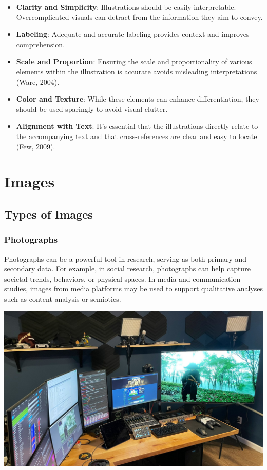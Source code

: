 \documentclass[
  b5paper]{book}
\begin{document}
\begin{itemize}
\item
  \textbf{Clarity and Simplicity}: Illustrations should be easily interpretable. Overcomplicated visuals can detract from the information they aim to convey.
\item
  \textbf{Labeling}: Adequate and accurate labeling provides context and improves comprehension.
\item
  \textbf{Scale and Proportion}: Ensuring the scale and proportionality of various elements within the illustration is accurate avoids misleading interpretations (Ware, 2004).
\item
  \textbf{Color and Texture}: While these elements can enhance differentiation, they should be used sparingly to avoid visual clutter.
\item
  \textbf{Alignment with Text}: It's essential that the illustrations directly relate to the accompanying text and that cross-references are clear and easy to locate (Few, 2009).
\end{itemize}

\hypertarget{images}{%
\section{Images}\label{images}}

\hypertarget{types-of-images}{%
\subsection*{Types of Images}\label{types-of-images}}

\hypertarget{photographs}{%
\subsubsection*{Photographs}\label{photographs}}

Photographs can be a powerful tool in research, serving as both primary and secondary data. For example, in social research, photographs can help capture societal trends, behaviors, or physical spaces. In media and communication studies, images from media platforms may be used to support qualitative analyses such as content analysis or semiotics.

\includegraphics[width=1\textwidth,height=\textheight]{images/itmejp.jpg}
\end{document}
